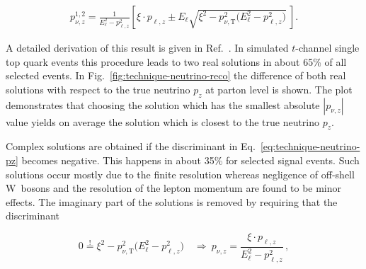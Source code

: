 \begin{align}
p_{\nu,z}^{1,2}=\frac{1}{E_{\ell}^{2}-p_{\ell,z}^{2}}\left[\xi\cdot p_{\ell,z}\pm E_{\ell} \sqrt{\xi^2-p_{\nu,\mathrm{T}}^2\big(E_{\ell}^2-p_{\ell,z}^2\big)}~\right]. \label{eq:technique-neutrino-pz}
\end{align}

A detailed derivation of this result is given in Ref.~\cite{Chwalek:1416031}. In simulated $t$-channel single top quark events this procedure leads to two real solutions in about 65\% of all selected events. In Fig.~\ref{fig:technique-neutrino-reco} the difference of both real solutions with respect to the true neutrino $p_{z}$ at parton level is shown. The plot demonstrates that choosing the solution which has the smallest absolute $|p_{\nu,z}|$ value yields on average the solution which is closest to the true neutrino $p_{z}$.


Complex solutions are obtained if the discriminant in Eq.~\ref{eq:technique-neutrino-pz} becomes negative. This happens in about 35\% for selected signal events. Such solutions occur mostly due to the finite \met resolution whereas negligence of off-shell W~bosons and the resolution of the lepton momentum are found to be minor effects. The imaginary part of the solutions is removed by requiring that the discriminant 

\begin{equation}
0\overset{!}{=}\xi^2-p_{\nu,\mathrm{T}}^2\big(E_{\ell}^2-p_{\ell,z}^2\big)\quad
\Rightarrow~ p_{\nu,z}=\frac{\xi\cdot p_{\ell,z}}{E_{\ell}^{2}-p_{\ell,z}^{2}}\,,\label{eq:technique-pz-complex}
\end{equation}

